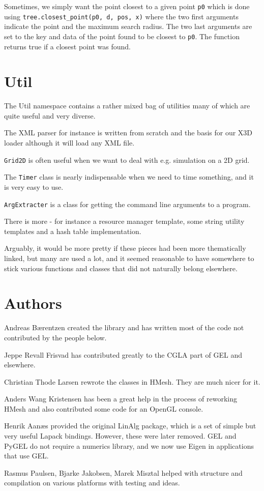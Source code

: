 \documentclass[a4paper]{article}
\begin{document}
Sometimes, we simply want the point closest to a given point \texttt{p0} which is done using \texttt{tree.closest\_point(p0, d, pos, x)} where the two first arguments indicate the point and the maximum search radius. The two last arguments are set to the key and data of the point found to be closest to \texttt{p0}. The function returns true if a closest point was found.
%
%
\section{Util}
%
%
The Util namespace contains a rather mixed bag of utilities many of which are quite useful and very diverse. 
\begin{trivlist}
\item The XML parser for instance is written from scratch and the basis for our X3D loader although it will load any XML file. 
\item \texttt{Grid2D} is often useful when we want to deal with e.g. simulation on a 2D grid. 
\item The \texttt{Timer} class is nearly indispensable when we need to time something, and it is very easy to use. 
\item \texttt{ArgExtracter} is a class for getting the command line arguments to a program. 
\item There is more - for instance a resource manager template, some string utility templates and a hash table implementation.
\end{trivlist}
Arguably, it would be more pretty if these pieces had been more thematically linked, but many are used a lot, and it seemed reasonable to have somewhere to stick various functions and classes that did not naturally belong elsewhere.
%
%
\section{Authors}  
%
%
\begin{trivlist}
\item Andreas B{\ae}rentzen created the library and has written most of the code not contributed by the people below.
\item Jeppe Revall Frisvad has contributed greatly to the CGLA part of GEL and elsewhere.
\item Christian Thode Larsen rewrote the classes in HMesh. They are much nicer for it.
\item Anders Wang Kristensen has been a great help in the process of reworking HMesh and also contributed some code for an OpenGL console.
\item Henrik Aan{\ae}s provided the original LinAlg package, which is a set of simple but very useful Lapack bindings. However, these were later removed. GEL and PyGEL do not require a numerics library, and we now use Eigen in applications that use GEL.
\item Rasmus Paulsen, Bjarke Jakobsen, Marek Misztal helped with structure and compilation on various platforms with testing and ideas.
\end{trivlist}
%
%
\end{document}
